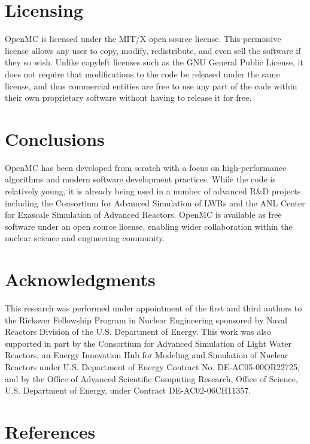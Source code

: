 \documentclass[5p,authoryear]{elsarticle}
\begin{document}
\section{Licensing}

OpenMC is licensed under the MIT/X open source license. This permissive license
allows any user to copy, modify, redistribute, and even sell the software if
they so wish. Unlike copyleft licenses such as the GNU General Public License,
it does not require that modifications to the code be released under the same
license, and thus commercial entities are free to use any part of the code
within their own proprietary software without having to release it for free.

\section{Conclusions}

OpenMC has been developed from scratch with a focus on high-performance
algorithms and modern software development practices. While the code is
relatively young, it is already being used in a number of advanced R\&D projects
including the Consortium for Advanced Simulation of LWRs and the ANL Center for
Exascale Simulation of Advanced Reactors. OpenMC is available as free software
under an open source license, enabling wider collaboration within the nuclear
science and engineering community.

\section*{Acknowledgments}

This research was performed under appointment of the first and third authors to
the Rickover Fellowship Program in Nuclear Engineering sponsored by Naval
Reactors Division of the U.S. Department of Energy. This work was also supported
in part by the Consortium for Advanced Simulation of Light Water Reactors, an
Energy Innovation Hub for Modeling and Simulation of Nuclear Reactors under
U.S. Department of Energy Contract No. DE-AC05-00OR22725, and by the Office of
Advanced Scientific Computing Research, Office of Science, U.S. Department of
Energy, under Contract DE-AC02-06CH11357.

\section*{References}



\end{document}
